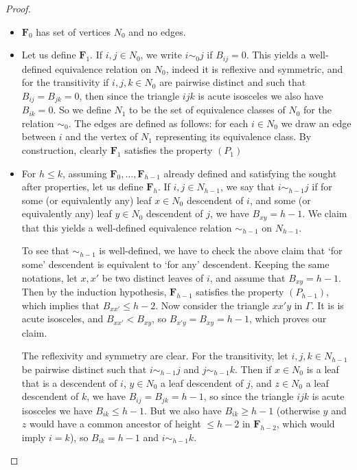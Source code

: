 \documentclass[10pt,a4paper]{amsart}
\begin{document}
\begin{proof}
\begin{itemize}
\item $\mathbf F_0$ has set of vertices $N_0$ and no edges. 
\item Let us define $\mathbf F_1$. If $i,j\in N_0$, we write $i\sim_0 j$ if $B_{ij}=0$. This yields a well-defined equivalence relation on $N_0$, indeed it is reflexive and symmetric, and for the transitivity if $i, j,k\in N_0$ are pairwise distinct and such that $B_{ij}=B_{jk}=0$, then since the triangle $ijk$ is acute isosceles we also have $B_{ik}=0$. So we define $N_1$ to be the set of equivalence classes of $N_0$ for the relation $\sim_0$. The edges are defined as follows: for each $i\in N_0$ we draw an edge between $i$ and the vertex of $N_1$ representing its equivalence class. By construction, clearly $\mathbf F_1$ satisfies the property $(P_1)$

\item For $h\leq k$, assuming $\mathbf F_0, \dots, \mathbf F_{h-1}$ already defined and satisfying the sought after properties, let us define $\mathbf F_h$. If $i, j\in N_{h-1}$, we say that $i\sim_{h-1} j$ if for some (or equivalently any) leaf $x\in N_0$ descendent of $i$, and some (or equivalently any) leaf $y\in N_0$ descendent of $j$, we have $B_{xy}=h-1$. We claim that this yields a well-defined equivalence relation $\sim_{h-1}$ on $N_{h-1}$. 

To see that $\sim_{h-1}$ is well-defined, we have to check the above claim that `for some' descendent is equivalent to `for any' descendent. Keeping the same notations, let $x,x'$ be two distinct leaves of $i$, and assume that $B_{xy}=h-1$. Then by the induction hypothesis, $\mathbf F_{h-1}$ satisfies the property $(P_{h-1})$, which implies that $B_{xx'}\leq h-2$. Now consider the triangle $xx'y$ in $\Gamma$. It is is acute isosceles, and $B_{xx'}<B_{xy}$, so $B_{x'y}=B_{xy}=h-1$, which proves our claim. 

The reflexivity and symmetry are clear. For the transitivity, let $i, j, k\in N_{h-1}$  be pairwise distinct such that $i\sim_{h-1} j$ and $j\sim_{h-1} k$. Then if $x\in N_0$ is a leaf that is a descendent of $i$, $y\in N_0$ a leaf descendent of $j$, and $z\in N_0$ a leaf descendent of $k$, we have $B_{ij}=B_{jk}=h-1$, so since the triangle $ijk$ is acute isosceles we have $B_{ik}\leq h-1$. But we also have $B_{ik}\geq h-1$ (otherwise $y$ and $z$ would have a common ancestor of height $\leq h-2$ in $\mathbf F_{h-2}$, which would imply $i=k$), so $B_{ik}=h-1$ and $i\sim_{h-1}k$. 


\end{itemize}
\end{proof}
\end{document}
